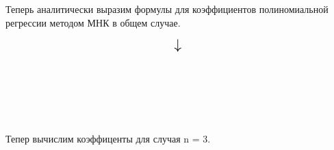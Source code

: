 \documentclass[a4paper, 14pt]{extarticle}
\begin{document}
Теперь аналитически выразим формулы для коэффициентов полиномиальной регрессии методом МНК в общем 
случае.

\vfill

\begin{equation*}
    \scalebox{1.5}{
        $\downarrow$
    }
\end{equation*}

\vfill\newpage

\begin{center}
     \\
\end{center}

\begin{center}
     \\
\end{center}

\begin{center}
     \\
\end{center}

\newpage

Тепер вычислим коэффиценты для случая n = 3.
\end{document}

